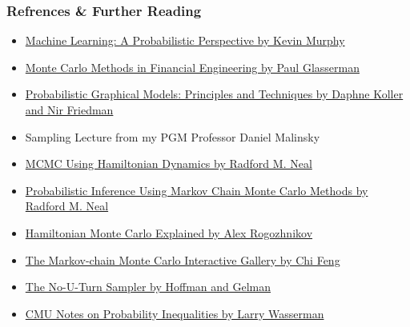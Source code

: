 \documentclass{beamer}
\begin{document}
\begin{frame}
\frametitle{Refrences \& Further Reading}
  \begin{itemize}
    \item \href{https://www.cs.ubc.ca/~murphyk/MLbook/}{Machine Learning: A Probabilistic Perspective by Kevin Murphy}
    \item \href{https://www.springer.com/gp/book/9780387004518}{Monte Carlo Methods in Financial Engineering by Paul Glasserman}
    \item \href{https://mitpress.mit.edu/books/probabilistic-graphical-models}{Probabilistic Graphical Models: Principles and Techniques by Daphne Koller and Nir Friedman}
    \item Sampling Lecture from my PGM Professor Daniel Malinsky
    \item \href{http://www.mcmchandbook.net/HandbookChapter5.pdf}{MCMC Using Hamiltonian Dynamics by Radford M. Neal}
    \item \href{http://www.cs.utoronto.ca/~radford/ftp/review.pdf}{Probabilistic Inference Using Markov Chain Monte Carlo Methods by Radford M. Neal}
    \item \href{http://arogozhnikov.github.io/2016/12/19/markov_chain_monte_carlo.html}{Hamiltonian Monte Carlo Explained by Alex Rogozhnikov}
    \item \href{https://chi-feng.github.io/mcmc-demo/app.html}{The Markov-chain Monte Carlo Interactive Gallery by Chi Feng}
    \item \href{http://www.stat.columbia.edu/~gelman/research/published/nuts.pdf}{The No-U-Turn Sampler by Hoffman and Gelman}
    \item \href{http://www.stat.cmu.edu/~larry/=stat705/Lecture2.pdf}{CMU Notes on Probability Inequalities by Larry Wasserman}
  \end{itemize}
\end{frame}


\end{document}
